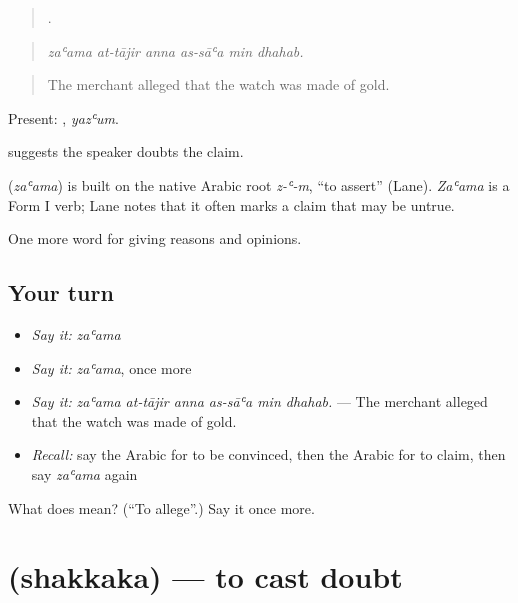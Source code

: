 \begin{quote}
     .
\end{quote}

\begin{quote}
\emph{zaʿama at-tājir anna as-sāʿa min dhahab.}
\end{quote}

\begin{quote}
The merchant alleged that the watch was made of gold.
\end{quote}

Present: , \emph{yazʿum}.

 suggests the speaker doubts the claim.

\begin{cousinweb}
\textbf{} (\emph{zaʿama}) is built on the native Arabic root \emph{z-ʿ-m}, \textquotedblleft{}to assert\textquotedblright{} (Lane). \emph{Zaʿama} is a Form I verb; Lane notes that it often marks a claim that may be untrue.
\end{cousinweb}

\begin{grammarlens}[title={What you've built}]
One more word for giving reasons and opinions.
\end{grammarlens}

\subsection*{Your turn}
\begin{itemize}
\raggedright
  \item \emph{Say it:} \emph{zaʿama}
  \item \emph{Say it:} \emph{zaʿama}, once more
  \item \emph{Say it:} \emph{zaʿama at-tājir anna as-sāʿa min dhahab.} — The merchant alleged that the watch was made of gold.
  \item \emph{Recall:} say the Arabic for to be convinced, then the Arabic for to claim, then say \emph{zaʿama} again
\end{itemize}

\begin{tcolorbox}[breakable,colback=teal!4,colframe=teal!35!black,title={Before you move on}]
What does  mean? (\textquotedblleft{}To allege\textquotedblright{}.) Say it once more.
\end{tcolorbox}
\section[\texorpdfstring{\ar{شكك} (shakkaka)}{شكك (shakkaka)}]{ (shakkaka) — to cast doubt}


